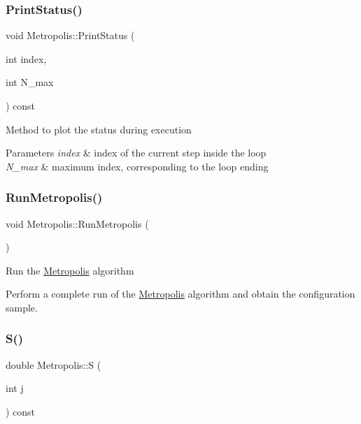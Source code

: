 \subsubsection{\texorpdfstring{Print\+Status()}{PrintStatus()}}
{\footnotesize\ttfamily void Metropolis\+::\+Print\+Status (\begin{DoxyParamCaption}\item[{int}]{index,  }\item[{int}]{N\+\_\+max }\end{DoxyParamCaption}) const\hspace{0.3cm}{\ttfamily [private]}}

Method to plot the status during execution


\begin{DoxyParams}{Parameters}
{\em index} & index of the current step inside the loop \\
\hline
{\em N\+\_\+max} & maximum index, corresponding to the loop ending \\
\hline
\end{DoxyParams}
\mbox{\label{classMetropolis_adaa45159158dd78986b830930c3b0b9e}} 
\subsubsection{\texorpdfstring{Run\+Metropolis()}{RunMetropolis()}}
{\footnotesize\ttfamily void Metropolis\+::\+Run\+Metropolis (\begin{DoxyParamCaption}{ }\end{DoxyParamCaption})}

Run the \hyperlink{classMetropolis}{Metropolis} algorithm

Perform a complete run of the \hyperlink{classMetropolis}{Metropolis} algorithm and obtain the configuration sample. \mbox{\label{classMetropolis_afb509c80a84817bf9b4ff183e02a44cb}} 
\subsubsection{\texorpdfstring{S()}{S()}}
{\footnotesize\ttfamily double Metropolis\+::S (\begin{DoxyParamCaption}\item[{int}]{j }\end{DoxyParamCaption}) const}

